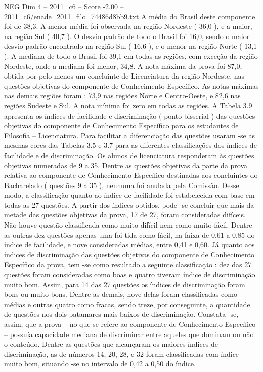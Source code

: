 \begin{textsample}{NEG Dim 4 – 2011\_c6 – Score -2.00 – 2011\_c6/enade\_2011\_filo\_74486d8bb9.txt}
A média do Brasil deste componente foi de 38,3.
A menor média foi observada na região Nordeste ( 36,0 ), e a maior, na região Sul ( 40,7 ).
O desvio padrão de todo o Brasil foi 16,0, sendo o maior desvio padrão encontrado na região Sul ( 16,6 ), e o menor na região Norte ( 13,1 ).
A mediana de todo o Brasil foi 39,1 em todas as regiões, com exceção da região Nordeste, onde a mediana foi menor, 34,8.
A nota máxima da prova foi 87,0, obtida por pelo menos um concluinte de Licenciatura da região Nordeste, nas questões objetivas do componente de Conhecimento Específico.
As notas máximas nas demais regiões foram : 73,9 nas regiões Norte e Centro-Oeste, e 82,6 nas regiões Sudeste e Sul.
A nota mínima foi zero em todas as regiões.
A Tabela 3.9 apresenta os índices de facilidade e discriminação ( ponto bisserial ) das questões objetivas do componente de Conhecimento Específico para os estudantes de Filosofia – Licenciatura.
Para facilitar a diferenciação das questões usaram -se as mesmas cores das Tabelas 3.5 e 3.7 para as diferentes classificações dos índices de facilidade e de discriminação.
Os alunos de licenciatura responderam às questões objetivas numeradas de 9 a 35.
Dentre as questões objetivas da parte da prova relativa ao componente de Conhecimento Específico destinadas aos concluintes do Bacharelado ( questões 9 a 35 ), nenhuma foi anulada pela Comissão.
Desse modo, a classificação quanto ao índice de facilidade foi estabelecida com base em todas as 27 questões.
A partir dos índices obtidos, pode -se concluir que mais da metade das questões objetivas da prova, 17 de 27, foram consideradas difíceis.
Não houve questão classificada como muito difícil nem como muito fácil.
Dentre as outras dez questões apenas uma foi tida como fácil, na faixa de 0,61 a 0,85 do índice de facilidade, e nove consideradas médias, entre 0,41 e 0,60.
Já quanto aos índices de discriminação das questões objetivas do componente de Conhecimento Específico da prova, tem -se como resultado a seguinte classificação : dez das 27 questões foram consideradas como boas e quatro tiveram índice de discriminação muito bom.
Assim, para 14 das 27 questões os índices de discriminação foram bons ou muito bons.
Dentre as demais, nove delas foram classificadas como médias e outras quatro como fracas, sendo treze, por conseguinte, a quantidade de questões nos dois patamares mais baixos de discriminação.
Constata -se, assim, que a prova – no que se refere ao componente de Conhecimento Específico – possuía capacidade mediana de discriminar entre aqueles que dominam ou não o conteúdo.
Dentre as questões que alcançaram os maiores índices de discriminação, as de números 14, 20, 28, e 32 foram classificadas com índice muito bom, situando -se no intervalo de 0,42 a 0,50 do índice.

\end{textsample}

